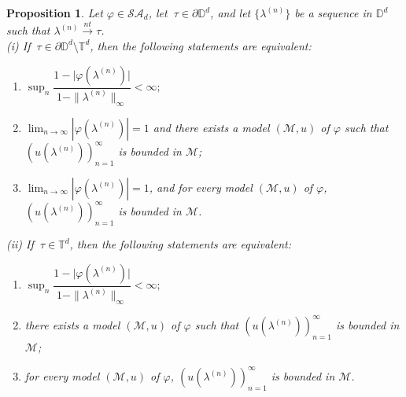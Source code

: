 \documentclass[11pt, reqno]{amsart}
\newtheorem{proposition}[theorem]{Proposition}
\newcommand\1{\boldsymbol {1}}
\newcommand{\T}{\mathbb{T}}
\newcommand{\ph}{\varphi}
\numberwithin{equation}{section}
\begin{document}
\begin{proposition}\label{prop5.2cara}
Let $\varphi\in\mathcal{SA}_{d}$,  let  $ \ \tau \in \partial \mathbb{D}^d$, and let
 $\{\lambda^{(n)}\}$ be a sequence in $\mathbb{D}^{d}$ such that $\lambda^{(n)}{\overset{nt}\rightarrow}\tau$.\\
{\rm (i)} If $ \ \tau \in \partial \mathbb{D}^d \setminus \mathbb{T}^d$,  then  the following statements are equivalent:
 \begin{enumerate}
    \item $\sup_{n} \dfrac{1-\lvert \varphi(\lambda^{(n)})\rvert}{1-\|\lambda^{(n)}\|_{\infty}}<\infty;$
    \item  $ \lim_{n \to \infty} |\ph(\lambda^{(n)})| =1$ and  there exists a model $(\mathcal{M},u)$ of $\varphi$ such that $(u(\lambda^{(n)}))_{n=1}^{\infty}$ is bounded in $\mathcal{M}$;
    \item  $ \lim_{n \to \infty} |\ph(\lambda^{(n)})| =1$, and  for every model $(\mathcal{M},u)$ of $\varphi$, $(u(\lambda^{(n)}))_{n=1}^{\infty}$ is bounded in $\mathcal{M}$.
\end{enumerate}
 {\rm(ii)} If $ \ \tau \in \T^d$, then  the following statements are equivalent:
\begin{enumerate}
    \item $\sup_{n} \dfrac{1-\lvert \varphi(\lambda^{(n)})\rvert}{1-\|\lambda^{(n)}\|_{\infty}}<\infty;$
    \item there exists a model $(\mathcal{M},u)$ of $\varphi$ such that $(u(\lambda^{(n)}))_{n=1}^{\infty}$ is bounded in $\mathcal{M}$;
    \item for every model $(\mathcal{M},u)$ of $\varphi$, $(u(\lambda^{(n)}))_{n=1}^{\infty}$ is bounded in $\mathcal{M}$.
\end{enumerate}
\end{proposition}
\end{document}
